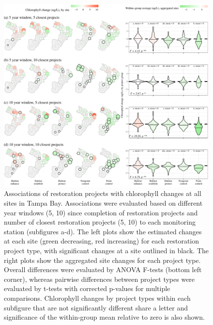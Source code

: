 \documentclass[]{article}
\begin{document}
\begin{figure}
\includegraphics[width=1\linewidth]{figs/prjsig} \caption{Associations of restoration projects with chlorophyll changes at all sites in Tampa Bay.  Associations were evaluated based on different year windows (5, 10) since completion of restoration projects and number of closest restoration projects (5, 10) to each monitoring station (subfigures a-d).  The left plots show the estimated changes at each site (green decreasing, red increasing) for each restoration project type, with significant changes at a site outlined in black.  The right plots show the aggregated site changes for each project type.  Overall differences were evaluated by ANOVA F-tests (bottom left corner), whereas pairwise differences between project types were evaluated by t-tests with corrected p-values for multiple comparisons.  Chlorophyll changes by project types within each subfigure that are not significantly different share a letter and significance of the within-group mean relative to zero is also shown.}\label{fig:prjsig}
\end{figure}
\end{document}
